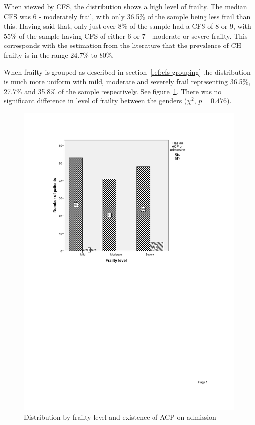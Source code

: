 \documentclass
[
	12pt,
	a4paper,
	oneside,
]{report}
\begin{document}
When viewed by CFS, the distribution shows a high level of frailty. The median 
CFS was 6 - moderately frail, with only 36.5\% of the sample being less frail
than this. Having said that, only just over 8\% of the sample had a CFS of 8
or 9, with 55\% of the sample having CFS of either 6 or 7 - moderate or
severe frailty. This corresponds with the estimation from the literature that 
the prevalence of CH frailty is in the range 24.7\% to 80\%.

When frailty is grouped as described in section~\ref{ref:cfs-grouping} the 
distribution is much more uniform with mild, moderate and severely frail
representing 36.5\%, 27.7\% and 35.8\% of the sample respectively.
See figure~\ref{fig:chart-dist-frailty-level}. There was no significant 
difference in level of frailty between the genders ($\chi^2$, $p=0.476$).
\label{sec:results-dist}

\begin{figure}[ht]
\centering
\caption{Distribution by frailty level and existence of ACP on admission}
\label{fig:chart-dist-frailty-level}
\includegraphics[width=\textwidth,
	trim={2.5cm 14cm 2.5cm 2.5cm},
	clip]{media/chart-dist-frailty-level}
\end{figure}
\end{document}
